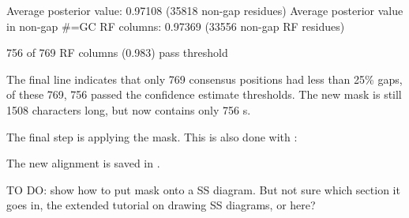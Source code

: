 
\begin{sreoutput}
Average posterior value:                            0.97108 (35818 non-gap residues)
Average posterior value in non-gap #=GC RF columns: 0.97369 (33556 non-gap RF residues)


756 of 769 RF columns (0.983) pass threshold
\end{sreoutput}

The final line indicates that only 769 consensus positions had less
than 25\% gaps, of these 769, 756 passed the confidence estimate
thresholds. The new mask  is still 1508 characters
long, but now contains only 756 s.

The final step is applying the mask. This is also done with
:


The new alignment is saved in .

TO DO: show how to put mask onto a SS diagram. But not sure which
section it goes in, the extended tutorial on drawing SS diagrams, or
here? 









